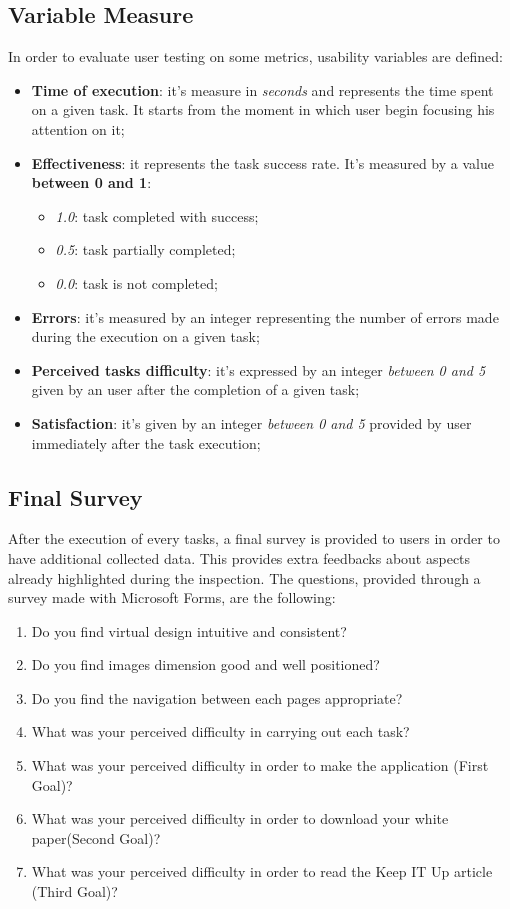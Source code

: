 \subsection{Variable Measure}
In order to evaluate user testing on some metrics, usability variables are defined:
\begin{itemize}
\item \textbf{Time of execution}: it's measure in \textit{seconds} and represents the time spent on a given task. It starts from the moment in which user begin focusing his attention on it;
\item \textbf{Effectiveness}: it represents the task success rate. It's measured by a value \textbf{between 0 and 1}:
    \begin{itemize} 
    \item \textit{1.0}: task completed with success;
    \item \textit{0.5}: task partially completed;
    \item \textit{0.0}: task is not completed;
    \end{itemize}
\item \textbf{Errors}: it's measured by an integer representing the number of errors made during the execution on a given task;
\item \textbf{Perceived tasks difficulty}: it's expressed by an integer \textit{between 0 and 5} given by an user after the completion of a given task;
\item \textbf{Satisfaction}: it's given by an integer \textit{between 0 and 5} provided by user immediately after the task execution;
\end{itemize}


\subsection{Final Survey}
After the execution of every tasks, a final survey is provided to users in order to have additional collected data. This provides extra feedbacks about aspects already highlighted during the inspection.
The questions, provided through a survey made with Microsoft Forms, are the following:
\begin{enumerate}
\item Do you find virtual design intuitive and consistent?
\item Do you find images dimension good and well positioned?
\item Do you find the navigation between each pages appropriate?
\item What was your perceived difficulty in carrying out each task?
\item What was your perceived difficulty in order to make the application (First Goal)?
\item What was your perceived difficulty in order to download your white paper(Second Goal)?
\item What was your perceived difficulty in order to read the Keep IT Up article (Third Goal)?
\end{enumerate}